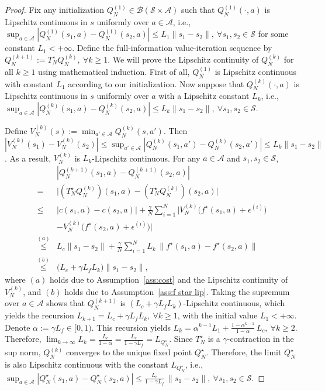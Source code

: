 \documentclass[letterpaper, 10 pt, conference]{ieeeconf}  %
\begin{document}
\begin{proof}
Fix any initialization $Q_N^{(1)} \in \mathcal{B}(\mathcal{S}\times\mathcal{A})$ such that $Q_N^{(1)}(\cdot,a)$ is Lipschitz continuous in $s$ uniformly over $a \in \mathcal A$, i.e., $\sup_{a\in\mathcal A}|Q_N^{(1)}(s_1,a)-Q_N^{(1)}(s_2,a)|
\le L_1\|s_1-s_2\|,\ \forall s_1,s_2\in\mathcal S$
for some constant $L_1<+\infty$. Define the full-information value-iteration sequence by $Q_N^{(k+1)}:=T_N^\star Q_N^{(k)},\ \forall k\ge 1$.
We will prove the Lipschitz continuity of $Q_N^{(k)}$ for all $k\ge 1$ using mathematical induction. First of all, $Q_N^{(1)}$ is Lipschitz continuous with constant $L_1$ according to our initialization. Now suppose that $Q_N^{(k)}(\cdot,a)$ is Lipschitz continuous in $s$ uniformly over $a$ with a Lipschitz constant $L_k$, i.e., $\sup_{a\in\mathcal A}|Q_N^{(k)}(s_1,a)-Q_N^{(k)}(s_2,a)|
\le L_k\|s_1-s_2\|,\ \forall s_1,s_2\in\mathcal S$.

Define $V_N^{(k)}(s):=\min_{a'\in\mathcal A}Q_N^{(k)}(s,a')$. Then
$|V_N^{(k)}(s_1)-V_N^{(k)}(s_2)|
\le \sup_{a'\in\mathcal A}|Q_N^{(k)}(s_1,a')-Q_N^{(k)}(s_2,a')|
\le L_k\|s_1-s_2\|$.
As a result, $V_N^{(k)}$ is $L_k$-Lipschitz continuous. For any $a\in\mathcal A$ and $s_1,s_2\in\mathcal S$,
\allowdisplaybreaks
\small
\begin{align*}
&|Q_N^{(k+1)}(s_1,a)-Q_N^{(k+1)}(s_2,a)| \\
=&\Big|(T_N^\star Q_N^{(k)})(s_1,a)-(T_N^\star Q_N^{(k)})(s_2,a)\Big|\\
\le &|c(s_1,a)-c(s_2,a)|
+\frac{\gamma}{N}\sum_{i=1}^N
\Big|V_N^{(k)}\big(f^\star(s_1,a)+\epsilon^{(i)}\big) \\
& -V_N^{(k)}\big(f^\star(s_2,a)+\epsilon^{(i)}\big)\Big|\\
\overset{(a)}\le &L_c\|s_1-s_2\|
+\frac{\gamma}{N}\sum_{i=1}^N L_k\,\big\|f^\star(s_1,a)-f^\star(s_2,a)\big\|\\
\overset{(b)}\le &\big(L_c+\gamma L_f L_k\big)\|s_1-s_2\|,
\end{align*}
\normalsize
where $(a)$ holds due to Assumption\ \ref{ass:cost} and the Lipschitz continuity of $V_N^{(k)}$, and $(b)$ holds due to Assumption\ \ref{ass:f star lip}. Taking the supremum over $a\in\mathcal A$ shows that $Q_N^{(k+1)}$ is $(L_c+\gamma L_f L_k)$-Lipschitz continuous, which yields the recursion
$L_{k+1} = L_c+\gamma L_f L_k,\ \forall k\ge 1$,
with the initial value $L_1<+\infty$.
Denote $\alpha:=\gamma L_f\in[0,1)$. This recursion yields
$L_k 
= \alpha^{k-1}L_1 + \frac{1-\alpha^{k-1}}{1-\alpha}\,L_c,\ \forall k\ge 2$.
Therefore, $\lim_{k\to\infty}L_k=\frac{L_c}{1-\alpha}=\frac{L_c}{1-\gamma L_f}=L_{Q_N^\star}$.
Since $T_N^\star$ is a $\gamma$-contraction in the sup norm, $Q_N^{(k)}$ converges to the unique fixed point $Q_N^\star$. Therefore, the limit $Q_N^\star$
is also Lipschitz continuous with the constant $L_{Q_N^\star}$, i.e.,
$\sup_{a\in\mathcal A}|Q_N^\star(s_1,a)-Q_N^\star(s_2,a)|
\le \frac{L_c}{1-\gamma L_f}\,\|s_1-s_2\|,
\ \forall s_1,s_2\in\mathcal S$.


\end{proof}
\end{document}
